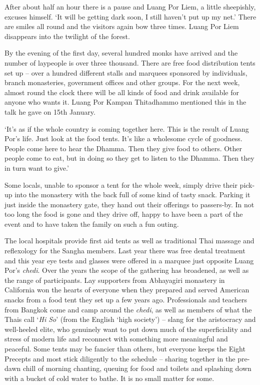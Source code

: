 After about half an hour there is a pause and Luang Por Liem, a little
sheepishly, excuses himself. `It will be getting dark soon, I still
haven't put up my net.' There are smiles all round and the visitors
again bow three times. Luang Por Liem disappears into the twilight of
the forest. 

By the evening of the first day, several hundred monks have arrived and
the number of laypeople is over three thousand. There are free food
distribution tents set up -- over a hundred different stalls and
marquees sponsored by individuals, branch monasteries, government
offices and other groups. For the next week, almost round the clock
there will be all kinds of food and drink available for anyone who wants
it. Luang Por Kampan Thitadhammo mentioned this in the talk he gave on
15th January. 

`It's as if the whole country is coming together here. This is the
result of Luang Por's life. Just look at the food tents. It's like a
wholesome cycle of goodness. People come here to hear the Dhamma. Then
they give food to others. Other people come to eat, but in doing so they
get to listen to the Dhamma. Then they in turn want to give.'

Some locals, unable to sponsor a tent for the whole week, simply drive
their pick-up into the monastery with the back full of some kind of
tasty snack. Parking it just inside the monastery gate, they hand out
their offerings to passers-by. In not too long the food is gone and they
drive off, happy to have been a part of the event and to have taken the
family on such a fun outing. 

The local hospitals provide first aid tents as well as traditional Thai
massage and reflexology for the Sangha members. Last year there was free
dental treatment and this year eye tests and glasses were offered in a
marquee just opposite Luang Por's \emph{chedi}. Over the years the scope
of the gathering has broadened, as well as the range of participants. 
Lay supporters from Abhayagiri monastery in California won the hearts of
everyone when they prepared and served American snacks from a food tent
they set up a few years ago. Professionals and teachers from Bangkok
come and camp around the \emph{chedi}, as well as members of what the
Thais call `\emph{Hi So}' (from the English `high society') -- slang for
the aristocracy and well-heeled elite, who genuinely want to put down
much of the superficiality and stress of modern life and reconnect with
something more meaningful and peaceful. Some tents may be fancier than
others, but everyone keeps the Eight Precepts and most stick diligently
to the schedule -- sharing together in the pre-dawn chill of morning
chanting, queuing for food and toilets and splashing down with a bucket
of cold water to bathe. It is no small matter for some. 

